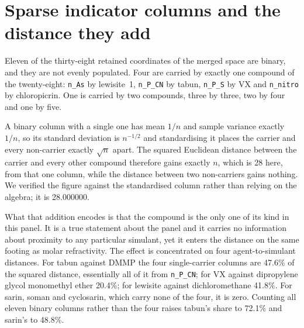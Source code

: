 \documentclass[11pt,a4paper]{article}
\begin{document}
\section{Sparse indicator columns and the distance they add}
\label{meth:sparse}

Eleven of the thirty-eight retained coordinates of the merged space are binary,
and they are not evenly populated. Four are carried by exactly one compound of
the twenty-eight: \texttt{n\_As} by lewisite~1, \texttt{n\_P\_CN} by tabun,
\texttt{n\_P\_S} by VX and \texttt{n\_nitro} by chloropicrin. One is carried by
two compounds, three by three, two by four and one by five.

A binary column with a single one has mean $1/n$ and sample variance exactly
$1/n$, so its standard deviation is $n^{-1/2}$ and standardising it places the
carrier and every non-carrier exactly $\sqrt{n}$ apart. The squared Euclidean
distance between the carrier and every other compound therefore gains exactly
$n$, which is 28 here, from that one column, while the distance between two
non-carriers gains nothing. We verified the figure against the standardised
column rather than relying on the algebra; it is 28.000000.

What that addition encodes is that the compound is the only one of its kind in
this panel. It is a true statement about the panel and it carries no information
about proximity to any particular simulant, yet it enters the distance on the
same footing as molar refractivity. The effect is concentrated on four
agent-to-simulant distances. For tabun against DMMP the four single-carrier
columns are 47.6\% of the squared distance, essentially all of it from
\texttt{n\_P\_CN}; for VX against dipropylene glycol monomethyl ether 20.4\%;
for lewisite against dichloromethane 41.8\%. For sarin, soman and cyclosarin,
which carry none of the four, it is zero. Counting all eleven binary columns
rather than the four raises tabun's share to 72.1\% and sarin's to 48.8\%.

\begin{table}[htb]
  \centering
  \caption{Valid matches on the twenty-eight-compound panel as sparse indicator
  columns are removed. The threshold for a binary column is the number of
  compounds carrying a one. The last row removes every coordinate with five or
  fewer distinct values, which also removes two counts and one protected
  coordinate and is the least defensible of the variants. The one-sided $p$ is
  the merged-space exact enumeration over all $\binom{17}{3}=680$ designations.}
  \label{tab:sparse}

\end{table}
\end{document}

